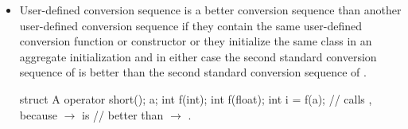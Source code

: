 \begin{itemize}
\item
User-defined conversion sequence
is a better conversion sequence than another user-defined conversion
sequence
if they contain the same user-defined conversion function or
constructor or they initialize the same class in an aggregate
initialization and in either case the second standard conversion
sequence of
is better than
the second standard conversion sequence of
.
\begin{example}
\begin{codeblock}
struct A {
  operator short();
} a;
int f(int);
int f(float);
int i = f(a);                   // calls , because  $\to$  is
                                // better than  $\to$ .
\end{codeblock}
\end{example}
\end{itemize}


